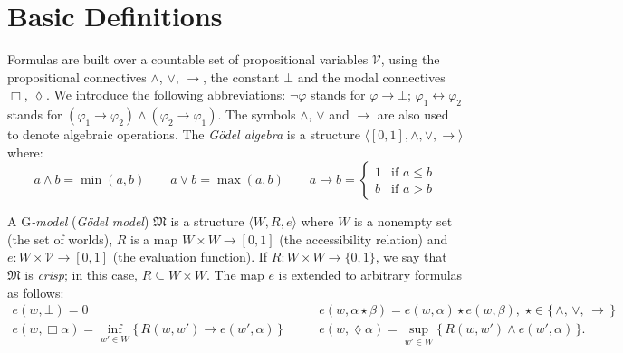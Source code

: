\documentclass[copyright,creativecommons]{eptcs}
\newcommand{\GM}{\mbox{$\mathrm{G}$}}
\newcommand{\tto}{\leftrightarrow}
\newcommand{\Diam}{\lozenge}
\newcommand{\PV}{\Vcal}
\newcommand{\stru}[1]{\langle #1 \rangle} %
\newcommand{\M}{\mathfrak{M}}
\renewcommand{\a}{\alpha}
\renewcommand{\b}{\beta}
\renewcommand{\phi}{\varphi}
\newcommand{\Vcal}{\mathcal{V}}
\begin{document}

\section{Basic Definitions}
\label{sec:basic}

Formulas are built over a countable set of propositional variables
$\PV$, using the propositional connectives $\land$, $\lor$, $\to$, the
constant $\bot$ and the modal connectives $\Box$, $\Diam$.  We introduce the following abbreviations:
$\neg \varphi$ stands  for $\varphi\to \bot$; 
$\phi_1\tto \phi_2$  stands  for $(\phi_1\to \phi_2)\land(\phi_2\to \phi_1)$.
The symbols
$\land$, $\lor$ and $\to$ are also used to denote algebraic
operations.
The \emph{G\"odel algebra} is a structure
$\stru{[0,1],\land,\lor,\to}$ where:
\[
a\land b = \min(a,b)
\qquad
a \lor b = \max(a,b)
\qquad
a\to b =
\begin{cases}
  1 & \mbox{if $a\leq b$}\\
  b &  \mbox{if $a > b$}     
\end{cases}
\]

\noindent
A \emph{\GM-model} (\emph{G\"odel model}) $\M$ is a structure
$\stru{W,R,e}$ where $W$ is a nonempty set (the set of worlds), $R$ is
a map $W\times W\to [0,1]$ (the accessibility relation) and $e : W
\times \PV\to [0,1]$ (the evaluation function).  If $R : W\times W\to
\{0,1\}$, we say that $\M$ is \emph{crisp}; in this case, $R \subseteq
W\times W$.  The map $e$ is extended to arbitrary formulas as follows:
\[
\begin{array}{ll}
  e(w,\bot) = 0 & e(w,\a \star \b) = e(w,\a) \star e(w,\b),\;\star\in \{\,\land,\,\lor,\,\to\,\}
  \\[1ex]
  e(w,\Box \a) = \inf_{w'\in W}  \{\,R(w,w') \to e(w',\a)  \,\}   \qquad
  &
  e(w,\Diam \a) =  \sup_{w'\in W}  \{\,R(w,w') \land e(w',\a)  \,\}.               
\end{array}
\]  
\end{document}
